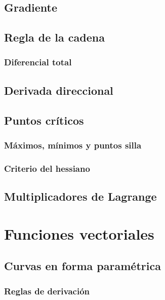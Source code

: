 \documentclass[12pt, fleqn]{report}                             %
\begin{document}
        \section{Gradiente}
                
        \section{Regla de la cadena}
        
            \subsection{Diferencial total}
            
        \section{Derivada direccional}
        
        \section{Puntos críticos}
        
            \subsection{Máximos, mínimos y puntos silla}
            
            \subsection{Criterio del hessiano}
            
        \section{Multiplicadores de Lagrange}


    \chapter{Funciones vectoriales}
    
        \section{Curvas en forma paramétrica}
        
            \subsection{Reglas de derivación}
            
\end{document}
